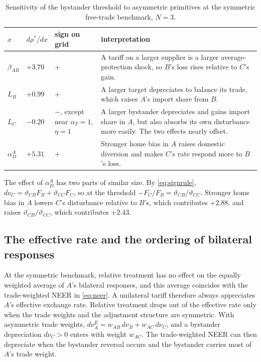 \documentclass[11pt]{article}
\begin{document}
\begin{table}[!htbp]
\centering
\small
\begin{tabular}{>{\centering\arraybackslash}p{1.2cm}>{\centering\arraybackslash}p{1.6cm}>{\centering\arraybackslash}p{2.2cm}>{\raggedright\arraybackslash}p{8.2cm}}
\toprule
$x$ & $d\rho^\ast/dx$ & sign on grid & interpretation \\
\midrule
$\beta_{AB}$ & $+3.70$ & $+$ & A tariff on a larger supplier is a larger average-protection shock, so $B$'s loss rises relative to $C$'s gain. \\[2pt]
$L_B$ & $+0.99$ & $+$ & A larger target depreciates to balance its trade, which raises $A$'s import share from $B$. \\[2pt]
$L_C$ & $-0.20$ & $-$, except near $\alpha_T=1$, $\eta=1$ & A larger bystander depreciates and gains import share in $A$, but also absorbs its own disturbance more easily. The two effects nearly offset. \\[2pt]
$\alpha_D^A$ & $+5.31$ & $+$ & Stronger home bias in $A$ raises domestic diversion and makes $C$'s rate respond more to $B$'s loss. \\
\bottomrule
\end{tabular}
\caption{Sensitivity of the bystander threshold to asymmetric primitives at the symmetric free-trade benchmark, $N=3$.}
\label{tab:asym-sens}
\end{table}

The effect of $\alpha_D^A$ has two parts of similar size. By \eqref{eq:signrule}, $d\nu_C=\vartheta_{CB}F_B+\vartheta_{CC}F_C$, so at the threshold $-F_C/F_B=\vartheta_{CB}/\vartheta_{CC}$. Stronger home bias in $A$ lowers $C$'s disturbance relative to $B$'s, which contributes $+2.88$, and raises $\vartheta_{CB}/\vartheta_{CC}$, which contributes $+2.43$.

\subsection{The effective rate and the ordering of bilateral responses}
\label{app:asym-neer}

At the symmetric benchmark, relative treatment has no effect on the equally weighted average of $A$'s bilateral responses, and this average coincides with the trade-weighted NEER in \eqref{eq:neer}. A unilateral tariff therefore always appreciates $A$'s effective exchange rate. Relative treatment drops out of the effective rate only when the trade weights and the adjustment structure are symmetric. With asymmetric trade weights, $d\nu_A^E=w_{AB}\,d\nu_B+w_{AC}\,d\nu_C$, and a bystander depreciation $d\nu_C>0$ enters with weight $w_{AC}$. The trade-weighted NEER can then depreciate when the bystander reversal occurs and the bystander carries most of $A$'s trade weight.
\end{document}
